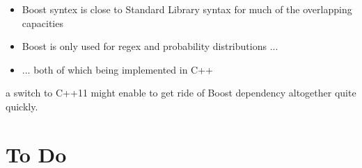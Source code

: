 \documentclass{article}
\begin{document}
\begin{itemize}
\item Boost syntex is close to Standard Library syntax for much of the overlapping capacities
\item Boost is only used for regex and probability distributions ...
\item ... both of which being implemented in C++
\end{itemize}

a switch to C++11 might enable to get ride of Boost dependency altogether quite quickly.

\section{To Do}
\end{document}
